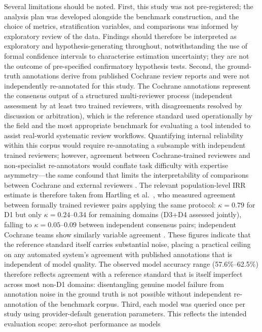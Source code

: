 \documentclass[../main.tex]{subfiles}
\begin{document}
Several limitations should be noted.
First, this study was not pre-registered; the analysis plan was developed
alongside the benchmark construction, and the choice of metrics,
stratification variables, and comparisons was informed by exploratory review
of the data.
Findings should therefore be interpreted as exploratory and
hypothesis-generating throughout, notwithstanding the use of formal confidence
intervals to characterise estimation uncertainty; they are not the outcome
of pre-specified confirmatory hypothesis tests.
Second, the ground-truth annotations derive from published Cochrane review
reports and were not independently re-annotated for this study.
The Cochrane annotations represent the consensus output of a structured
multi-reviewer process (independent assessment by at least two trained
reviewers, with disagreements resolved by discussion or arbitration), which
is the reference standard used operationally by the field and the most
appropriate benchmark for evaluating a tool intended to assist real-world
systematic review workflows.
Quantifying internal reliability within this corpus would require re-annotating
a subsample with independent trained reviewers; however, agreement between
Cochrane-trained reviewers and non-specialist re-annotators would conflate
task difficulty with expertise asymmetry---the same confound that limits the
interpretability of comparisons between Cochrane and external reviewers
\citep{ArmijoOlivo2014}.
The relevant population-level IRR estimate is therefore taken from Hartling
et al.\ \citep{Hartling2013}, who measured agreement between formally trained
reviewer pairs applying the same protocol: $\kappa = 0.79$ for D1 but only
$\kappa = 0.24$--$0.34$ for remaining domains (D3+D4 assessed jointly), falling to $\kappa = 0.05$--$0.09$
between independent consensus pairs; independent Cochrane teams show
similarly variable agreement \citep{Konsgen2020}.
These figures indicate that the reference standard itself carries substantial
noise, placing a practical ceiling on any automated system's agreement with
published annotations that is independent of model quality.
The observed model accuracy range (57.6\%--62.5\%) therefore reflects
agreement with a reference standard that is itself imperfect across most
non-D1 domains: disentangling genuine model failure from annotation noise
in the ground truth is not possible without independent re-annotation of
the benchmark corpus.
Third, each model was queried once per study using provider-default generation
parameters.
This reflects the intended evaluation scope: zero-shot performance as models
\end{document}
